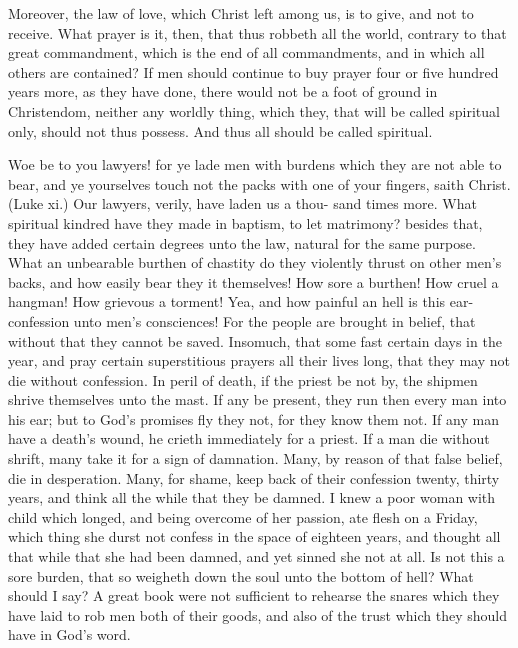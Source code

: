 \documentclass{custom}
\begin{document}
Moreover, the law of love, which Christ left among us, 
is to give, and not to receive. What prayer is it, then, 
that thus robbeth all the world, contrary to that great 
commandment, which is the end of all commandments, 
and in which all others are contained? If men should 
continue to buy prayer four or five hundred years more, 
as they have done, there would not be a foot of ground in 
Christendom, neither any worldly thing, which they, that 
will be called spiritual only, should not thus possess. 
And thus all should be called spiritual. 

Woe be to you lawyers! for ye lade men with burdens 
which they are not able to bear, and ye yourselves touch 
not the packs with one of your fingers, saith Christ. 
(Luke xi.) Our lawyers, verily, have laden us a thou- 
sand times more. What spiritual kindred have they 
made in baptism, to let matrimony? besides that, they 
have added certain degrees unto the law, natural for the 
same purpose. What an unbearable burthen of chastity 
do they violently thrust on other men's backs, and how 
easily bear they it themselves! How sore a burthen! 
How cruel a hangman! How grievous a torment! Yea, 
and how painful an hell is this ear-confession unto men's 
consciences! For the people are brought in belief, that 
without that they cannot be saved. Insomuch, that some 
fast certain days in the year, and pray certain superstitious 
prayers all their lives long, that they may not die without 
confession. In peril of death, if the priest be not by, the 
shipmen shrive themselves unto the mast. If any be 
present, they run then every man into his ear; but to 
God's promises fly they not, for they know them not. If 
any man have a death's wound, he crieth immediately for 
a priest. If a man die without shrift, many take it for a 
sign of damnation. Many, by reason of that false belief, 
die in desperation. Many, for shame, keep back of their 
confession twenty, thirty years, and think all the while 
that they be damned. I knew a poor woman with child 
which longed, and being overcome of her passion, ate 
flesh on a Friday, which thing she durst not confess in 
the space of eighteen years, and thought all that while 
that she had been damned, and yet sinned she not at all. 
Is not this a sore burden, that so weigheth down the soul 
unto the bottom of hell? What should I say? A great 
book were not sufficient to rehearse the snares which they 
have laid to rob men both of their goods, and also of the 
trust which they should have in God's word. 
\end{document}
